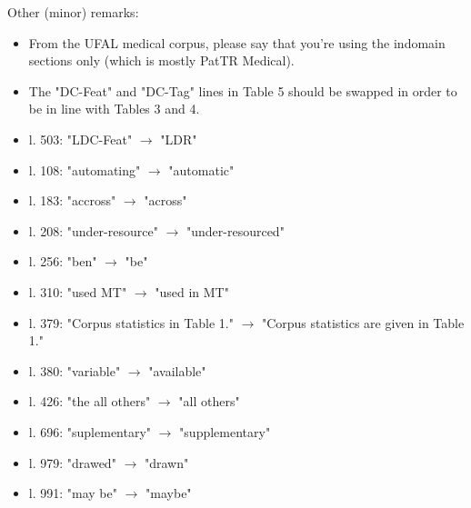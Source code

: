 \documentclass[12pt,times,a4paper,twoside]{article}
\begin{document}
Other (minor) remarks:
\begin{itemize}
\item From the UFAL medical corpus, please say that you're using the indomain sections only (which is mostly PatTR Medical).
\item The "DC-Feat" and "DC-Tag" lines in Table 5 should be swapped in order to be in line with Tables 3 and 4.
\item l. 503: "LDC-Feat" $\rightarrow$ "LDR"
\item l. 108: "automating" $\rightarrow$ "automatic"
\item l. 183: "accross" $\rightarrow$ "across"
\item l. 208: "under-resource" $\rightarrow$ "under-resourced"
\item l. 256: "ben" $\rightarrow$ "be"
\item l. 310: "used MT" $\rightarrow$ "used in MT"
\item l. 379: "Corpus statistics in Table 1." $\rightarrow$ "Corpus statistics are given in Table 1."
\item l. 380: "variable" $\rightarrow$ "available"
\item l. 426: "the all others" $\rightarrow$ "all others"
\item l. 696: "suplementary" $\rightarrow$ "supplementary"
\item l. 979: "drawed" $\rightarrow$ "drawn"
\item l. 991: "may be" $\rightarrow$ "maybe"
\end{itemize}
\end{document}
